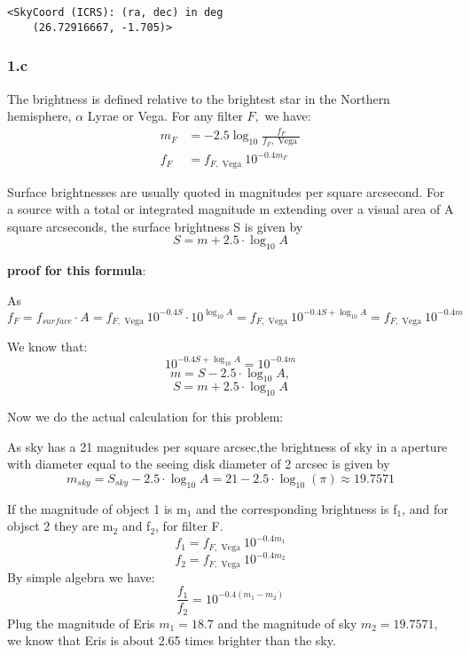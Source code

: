 \documentclass[11pt]{article}
\begin{document}
    \begin{Verbatim}[commandchars=\\\{\}]
<SkyCoord (ICRS): (ra, dec) in deg
    (26.72916667, -1.705)>
\end{Verbatim}

    \hypertarget{c}{%
\subsubsection{1.c}\label{c}}

The brightness is defined relative to the brightest star in the Northern
hemisphere, \(\alpha\) Lyrae or Vega. For any filter \(F,\) we have: \[
\begin{aligned} m_{F} &=-2.5 \log _{10} \frac{f_{F}}{f_{F}, \text { Vega }} \\ f_{F} &=f_{F, \text { Vega }} 10^{-0.4 m_{F}} \end{aligned}
\]

Surface brightnesses are usually quoted in magnitudes per square
arcsecond. For a source with a total or integrated magnitude m extending
over a visual area of A square arcseconds, the surface brightness S is
given by \[S=m+2.5\cdot \log_{10}A\]

\textbf{proof for this formula}:

As
\[f_{F} = f_{surface} \cdot A =f_{F, \text { Vega }} 10^{-0.4 S} \cdot 10^{\log_{10}A} = f_{F, \text { Vega }} 10^{-0.4 S+\log_{10}A} = f_{F, \text { Vega }} 10^{-0.4m} \]

We know that: \[ 
10^{-0.4 S+\log_{10}A} = 10^{-0.4m}
\] \[ m = S-2.5\cdot \log_{10}A,\] \[S=m+2.5\cdot \log_{10}A \]

Now we do the actual calculation for this problem:

As sky has a 21 magnitudes per square arcsec,the brightness of sky in a
aperture with diameter equal to the seeing disk diameter of 2 arcsec is
given by \[
m_{sky}= S_{sky}-2.5\cdot \log_{10}A = 21-2.5\cdot \log_{10}(\pi) \approx 19.7571
\]

If the magnitude of object 1 is m\(_1\) and the corresponding brightness
is f\(_1\), and for objsct 2 they are m\(_2\) and f\(_2\), for filter F.
\[f_{1} =f_{F, \text { Vega }} 10^{-0.4 m_{1}}\]
\[f_{2} =f_{F, \text { Vega }} 10^{-0.4 m_{2}}\] By simple algebra we
have: \[
\frac{f_1}{f_2} = 10^{-0.4(m_1-m_2)}
\] Plug the magnitude of Eris \(m_1 = 18.7\) and the magnitude of sky
\(m_2 = 19.7571\), we know that Eris is about 2.65 times brighter than
the sky.
\end{document}
